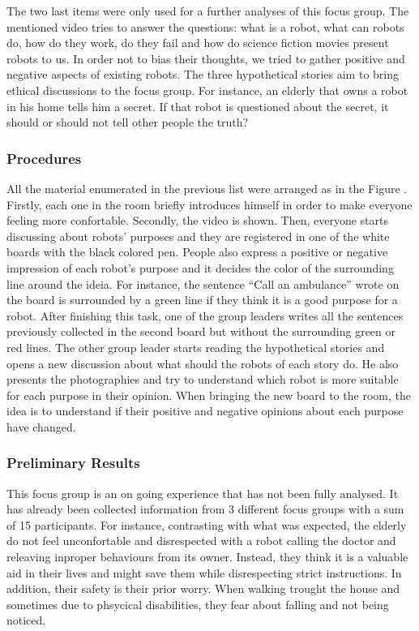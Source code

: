 The two last items were only used for a further analyses of this focus group.
The mentioned video tries to answer the questions: what is a robot, what can robots do, how do they work, do they fail and how do science fiction movies present robots to us.
In order not to bias their thoughts, we tried to gather positive and negative aspects of existing robots.
The three hypothetical stories aim to bring ethical discussions to the focus group.
For instance, an elderly that owns a robot in his home tells him a secret.
If that robot is questioned about the secret, it should or should not tell other people the truth?

\subsubsection{Procedures}
All the material enumerated in the previous list were arranged as in the Figure .
Firstly, each one in the room briefly introduces himself in order to make everyone feeling more confortable.
Secondly, the video is shown.
Then, everyone starts discussing about robots' purposes and they are registered in one of the white boards with the black colored pen.
People also express a positive or negative impression of each robot's purpose and it decides the color of the surrounding line around the ideia.
For instance, the sentence ``Call an ambulance'' wrote on the board is surrounded by a green line if they think it is a good purpose for a robot.
After finishing this task, one of the group leaders writes all the sentences previously collected in the second board but without the surrounding green or red lines.
The other group leader starts reading the hypothetical stories and opens a new discussion about what should the robots of each story do.
He also presents the photographies and try to understand which robot is more suitable for each purpose in their opinion.
When bringing the new board to the room, the idea is to understand if their positive and negative opinions about each purpose have changed.

\subsubsection{Preliminary Results}

This focus group is an on going experience that has not been fully analysed.
It has already been collected information from 3 different focus groups with a sum of 15 participants.
For instance, contrasting with what was expected, the elderly do not feel unconfortable and disrespected with a robot calling the doctor and releaving inproper behaviours from its owner. 
Instead, they think it is a valuable aid in their lives and might save them while disrespecting strict instructions.
In addition, their safety is their prior worry.
When walking trought the house and sometimes due to phsycical disabilities, they fear about falling and not being noticed.







